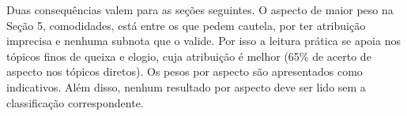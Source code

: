 Duas consequências valem para as seções seguintes. O aspecto de maior peso na Seção 5, comodidades, está entre os que pedem cautela, por ter atribuição imprecisa e nenhuma subnota que o valide. Por isso a leitura prática se apoia nos tópicos finos de queixa e elogio, cuja atribuição é melhor (65\% de acerto de aspecto nos tópicos diretos). Os pesos por aspecto são apresentados como indicativos. Além disso, nenhum resultado por aspecto deve ser lido sem a classificação correspondente.
